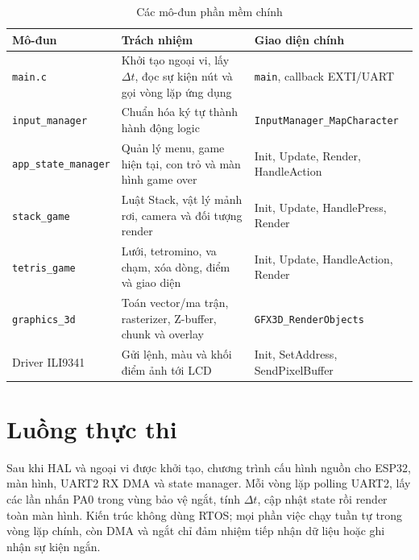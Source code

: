 \begin{table}[H]
\centering
\caption{Các mô-đun phần mềm chính}
\label{tab:modules}
\small
\begin{tabularx}{\textwidth}{@{}p{}Y Y@{}}
\toprule
\textbf{Mô-đun} & \textbf{Trách nhiệm} & \textbf{Giao diện chính} \\
\midrule
\texttt{main.c} & Khởi tạo ngoại vi, lấy $\Delta t$, đọc sự kiện nút và gọi vòng lặp ứng dụng & \texttt{main}, callback EXTI/UART \\
\texttt{input\_manager} & Chuẩn hóa ký tự thành hành động logic & \texttt{InputManager\_MapCharacter} \\
\texttt{app\_state\_manager} & Quản lý menu, game hiện tại, con trỏ và màn hình game over & Init, Update, Render, HandleAction \\
\texttt{stack\_game} & Luật Stack, vật lý mảnh rơi, camera và đối tượng render & Init, Update, HandlePress, Render \\
\texttt{tetris\_game} & Lưới, tetromino, va chạm, xóa dòng, điểm và giao diện & Init, Update, HandleAction, Render \\
\texttt{graphics\_3d} & Toán vector/ma trận, rasterizer, Z-buffer, chunk và overlay & \texttt{GFX3D\_RenderObjects} \\
Driver ILI9341 & Gửi lệnh, màu và khối điểm ảnh tới LCD & Init, SetAddress, SendPixelBuffer \\
\bottomrule
\end{tabularx}
\end{table}

\section{Luồng thực thi}

Sau khi HAL và ngoại vi được khởi tạo, chương trình cấu hình nguồn cho ESP32, màn hình, UART2 RX DMA và state manager. Mỗi vòng lặp polling UART2, lấy các lần nhấn PA0 trong vùng bảo vệ ngắt, tính $\Delta t$, cập nhật state rồi render toàn màn hình. Kiến trúc không dùng RTOS; mọi phần việc chạy tuần tự trong vòng lặp chính, còn DMA và ngắt chỉ đảm nhiệm tiếp nhận dữ liệu hoặc ghi nhận sự kiện ngắn.
